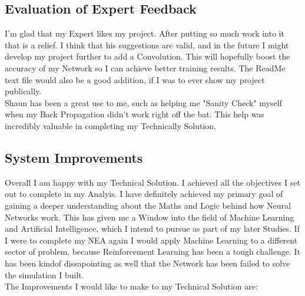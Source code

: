 \begin{flushleft}
\begin{enumerate}
                \vspace{0.5cm}
        \end{enumerate}

        \vspace{0.5cm}
    \subsection{Evaluation of Expert Feedback}
        \vspace{0.2cm}
        I'm glad that my Expert likes my project. After putting so much work into it that is a relief. I think that his suggestions are valid, and
        in the future I might develop my project further to add a Convolution. This will hopefully boost the accuracy of my Network so I can achieve
        better training results. The ReadMe text file would also be a good addition, if I was to ever show my project publically. \\
        \vspace{0.2cm}
        Shaun has been a great use to me, such as helping me "Sanity Check" myself when my Back Propagation didn't work right off the bat. This
        help was incredibly valuable in completing my Technically Solution. \\
        \vspace{0.5cm}
    \subsection{System Improvements}
        \vspace{0.2cm}
        Overall I am happy with my Technical Solution. I achieved all the objectives I set out to complete in my Analyis. I have definitely achieved
        my primary goal of gaining a deeper understanding about the Maths and Logic behind how Neural Networks work. This has given me a Window into
        the field of Machine Learning and Artificial Intelligence, which I intend to pursue as part of my later Studies. If I were to complete my NEA
        again I would apply Machine Learning to a different sector of problem, because Reinforcement Learning has been a tough challenge. It has been
        kindof dissapointing as well that the Network has been failed to solve the simulation I built. \\
        \vspace{0.2cm}
        The Improvements I would like to make to my Technical Solution are: \\
        \vspace{0.5cm}


\end{flushleft}
